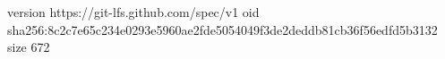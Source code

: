 version https://git-lfs.github.com/spec/v1
oid sha256:8c2c7e65c234e0293e5960ae2fde5054049f3de2deddb81cb36f56edfd5b3132
size 672
